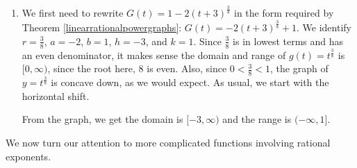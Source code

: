 \documentclass{ximera}
\begin{document}
\begin{example}
\begin{enumerate}


\begin{center}
\end{center}
 
 We get the domain and range here are both $(-\infty, \infty)$.
 
 \item We first need to rewrite $G(t) = 1 - 2(t+3)^{\frac{3}{8}}$ in the form required by Theorem \ref{linearrationalpowergraphs}:  $G(t) =- 2(t+3)^{\frac{3}{8}} + 1$.  We identify $r = \frac{3}{8}$, $a = -2$, $b = 1$, $h = -3$, and $k = 1$.  Since $\frac{3}{8}$ is in lowest terms and has an even denominator,  it makes sense the domain and range of $g(t) = t^{\frac{3}{8}}$ is $[0, \infty)$, since the root here, $8$ is even.  Also, since $0< \frac{3}{8} < 1$, the graph of  $y = t^{\frac{3}{8}}$ is concave down, as we would expect. As usual, we start with the horizontal shift.


 \begin{center}
 \end{center}
 

 




From the graph, we get the domain is $[-3, \infty)$ and the range is $(-\infty, 1]$.

\end{enumerate}

\end{example}

We now turn our attention to more complicated functions involving rational exponents.
\end{document}
